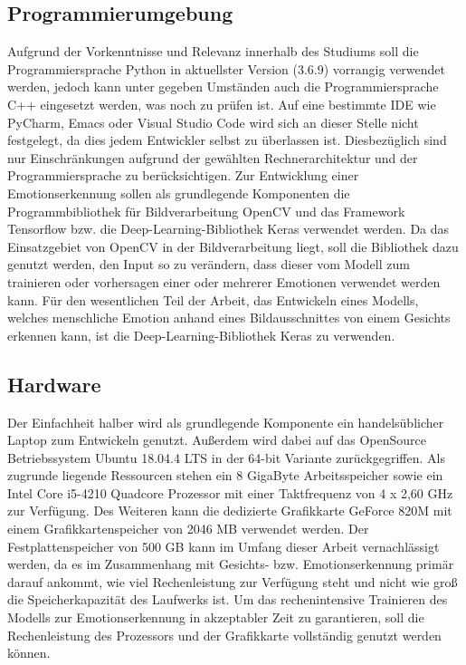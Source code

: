 \documentclass[12pt, a4paper]{scrbook}
\begin{document}
\subsection{Programmierumgebung}
Aufgrund der Vorkenntnisse und Relevanz innerhalb des Studiums soll die Programmiersprache Python in aktuellster Version (3.6.9) vorrangig verwendet werden, jedoch kann unter gegeben Umständen auch die Programmiersprache C++ eingesetzt werden, was noch zu prüfen ist. Auf eine bestimmte IDE wie PyCharm, Emacs oder Visual Studio Code wird sich an dieser Stelle nicht festgelegt, da dies jedem Entwickler selbst zu überlassen ist. Diesbezüglich sind nur Einschränkungen aufgrund der gewählten Rechnerarchitektur und der Programmiersprache zu berücksichtigen.\newline
Zur Entwicklung einer Emotionserkennung sollen als grundlegende Komponenten die Programmbibliothek für Bildverarbeitung OpenCV und das Framework Tensorflow bzw. die Deep-Learning-Bibliothek Keras verwendet werden. Da das Einsatzgebiet von OpenCV in der Bildverarbeitung liegt, soll die Bibliothek dazu genutzt werden, den Input so zu verändern, dass dieser vom Modell zum trainieren oder vorhersagen einer oder mehrerer Emotionen verwendet werden kann. Für den wesentlichen Teil der Arbeit, das Entwickeln eines Modells, welches menschliche Emotion anhand eines Bildausschnittes von einem Gesichts erkennen kann, ist die Deep-Learning-Bibliothek Keras zu verwenden.

\subsection{Hardware}
Der Einfachheit halber wird als grundlegende Komponente ein handelsüblicher Laptop zum Entwickeln genutzt.  Außerdem wird dabei auf das OpenSource Betriebssystem Ubuntu 18.04.4 LTS in der 64-bit Variante zurückgegriffen. Als zugrunde liegende Ressourcen stehen ein 8 GigaByte Arbeitsspeicher sowie ein Intel Core i5-4210 Quadcore Prozessor mit einer Taktfrequenz von 4 x 2,60 GHz zur Verfügung. Des Weiteren kann die dedizierte Grafikkarte GeForce 820M mit einem Grafikkartenspeicher von 2046 MB verwendet werden. Der Festplattenspeicher von 500 GB kann im Umfang dieser Arbeit vernachlässigt werden, da es im Zusammenhang mit Gesichts- bzw. Emotionserkennung primär darauf ankommt, wie viel Rechenleistung zur Verfügung steht und nicht wie groß die Speicherkapazität des Laufwerks ist. Um das rechenintensive Trainieren des Modells zur Emotionserkennung in akzeptabler Zeit zu garantieren, soll die Rechenleistung des Prozessors und der Grafikkarte vollständig genutzt werden können.
\end{document}
